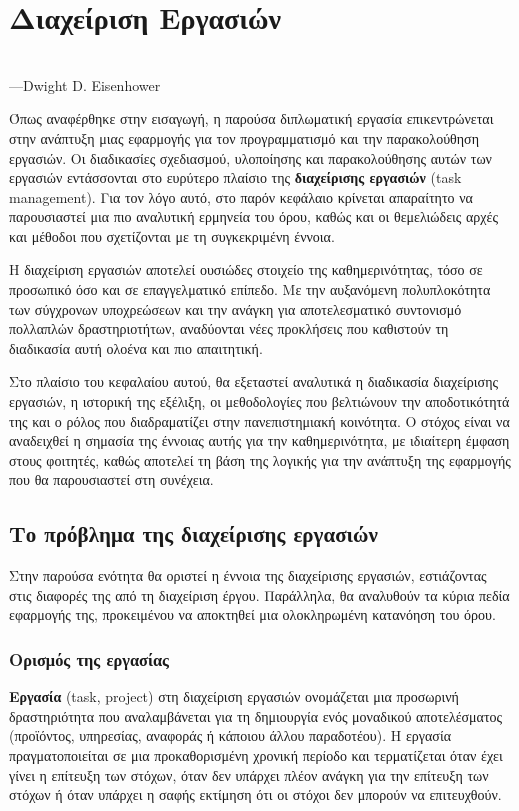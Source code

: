 \chapter{Διαχείριση Εργασιών}
    \begin{displayquote} \centering
         \\
        \hspace*{\fill}---Dwight D. Eisenhower
    \end{displayquote}
    \vspace{1em}

    Όπως αναφέρθηκε στην εισαγωγή, η παρούσα διπλωματική εργασία επικεντρώνεται στην ανάπτυξη μιας εφαρμογής για τον προγραμματισμό και την παρακολούθηση εργασιών. Οι διαδικασίες σχεδιασμού, υλοποίησης και παρακολούθησης αυτών των εργασιών εντάσσονται στο ευρύτερο πλαίσιο της \textbf{διαχείρισης εργασιών} (task management). Για τον λόγο αυτό, στο παρόν κεφάλαιο κρίνεται απαραίτητο να παρουσιαστεί μια πιο αναλυτική ερμηνεία του όρου, καθώς και οι θεμελιώδεις αρχές και μέθοδοι που σχετίζονται με τη συγκεκριμένη έννοια.

    Η διαχείριση εργασιών αποτελεί ουσιώδες στοιχείο της καθημερινότητας, τόσο σε προσωπικό όσο και σε επαγγελματικό επίπεδο. Με την αυξανόμενη πολυπλοκότητα των σύγχρονων υποχρεώσεων και την ανάγκη για αποτελεσματικό συντονισμό πολλαπλών δραστηριοτήτων, αναδύονται νέες προκλήσεις που καθιστούν τη διαδικασία αυτή ολοένα και πιο απαιτητική.

    Στο πλαίσιο του κεφαλαίου αυτού, θα εξεταστεί αναλυτικά η διαδικασία διαχείρισης εργασιών, η ιστορική της εξέλιξη, οι μεθοδολογίες που βελτιώνουν την αποδοτικότητά της και ο ρόλος που διαδραματίζει στην πανεπιστημιακή κοινότητα. Ο στόχος είναι να αναδειχθεί η σημασία της έννοιας αυτής για την καθημερινότητα, με ιδιαίτερη έμφαση στους φοιτητές, καθώς αποτελεί τη βάση της λογικής για την ανάπτυξη της εφαρμογής που θα παρουσιαστεί στη συνέχεια.

    \section{Το πρόβλημα της διαχείρισης εργασιών}
        Στην παρούσα ενότητα θα οριστεί η έννοια της διαχείρισης εργασιών, εστιάζοντας στις διαφορές της από τη διαχείριση έργου. Παράλληλα, θα αναλυθούν τα κύρια πεδία εφαρμογής της, προκειμένου να αποκτηθεί μια ολοκληρωμένη κατανόηση του όρου.

        \subsection{Ορισμός της εργασίας}
            \textbf{Εργασία} (task, project) στη διαχείριση εργασιών ονομάζεται μια προσωρινή δραστηριότητα που αναλαμβάνεται για τη δημιουργία ενός μοναδικού αποτελέσματος (προϊόντος, υπηρεσίας, αναφοράς ή κάποιου άλλου παραδοτέου). Η εργασία πραγματοποιείται σε μια προκαθορισμένη χρονική περίοδο και τερματίζεται όταν έχει γίνει η επίτευξη των στόχων, όταν δεν υπάρχει πλέον ανάγκη για την επίτευξη των στόχων ή όταν υπάρχει η σαφής εκτίμηση ότι οι στόχοι δεν μπορούν να επιτευχθούν. \cite{PMBOK}

